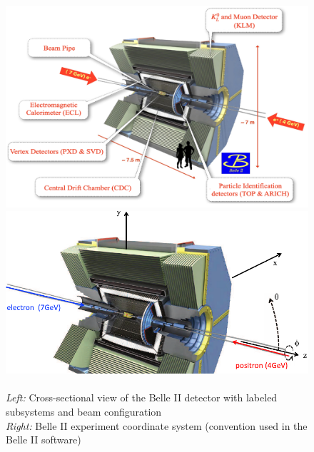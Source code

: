 \begin{figure}[htbp]
  \centering
  \begin{minipage}[c]{0.5\textwidth}
    \centering
    \includegraphics[width=\linewidth]{static/belle2-components.png}
  \end{minipage}%
  \vrule%
  \begin{minipage}[c]{0.5\textwidth}
    \centering
    \includegraphics[width=\linewidth]{static/basf2-coordinate-system.pdf}
  \end{minipage}
  \caption{%
    \\\emph{Left:} Cross-sectional view of the Belle II detector with labeled subsystems and beam configuration \cite{belle2-components}\\
    \emph{Right:} Belle II experiment coordinate system (convention used in the Belle II software)  \cite{belle2-coordinates}
  }
  \label{fig:belle2-schematics}
\end{figure}